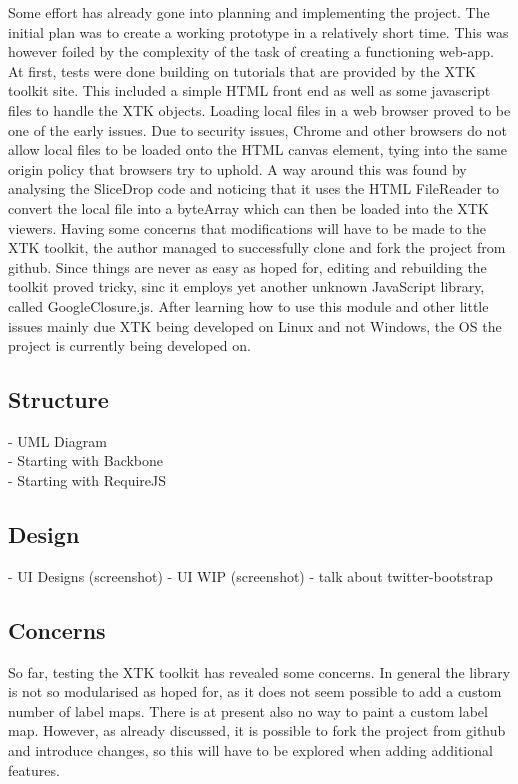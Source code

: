 \documentclass[a4paper,11pt,titlepage]{article}
\begin{document}
Some effort has already gone into planning and implementing the project. The initial plan was to create a working prototype in a relatively short time. This was however foiled by the complexity of the task of creating a functioning web-app. At first, tests were done building on tutorials that are provided by the XTK toolkit site. This included a simple HTML front end as well as some javascript files to handle the XTK objects.
Loading local files in a web browser proved to be one of the early issues. Due to security issues, Chrome and other browsers do not allow local files to be loaded onto the HTML canvas element, tying into the same origin policy that browsers try to uphold. A way around this was found by analysing the SliceDrop code and noticing that it uses the HTML FileReader to convert the local file into a byteArray which can then be loaded into the XTK viewers.
Having some concerns that modifications will have to be made to the XTK toolkit, the author managed to successfully clone and fork the project from github. Since things are never as easy as hoped for, editing and rebuilding the toolkit proved tricky, sinc it employs yet another unknown JavaScript library, called GoogleClosure.js. After learning how to use this module and other little issues mainly due XTK being developed on Linux and not Windows, the OS the project is currently being developed on.



\subsection{Structure}
- UML Diagram\\
- Starting with Backbone\\
- Starting with RequireJS

\subsection{Design}
- UI Designs (screenshot)
- UI WIP (screenshot)
- talk about twitter-bootstrap

\subsection{Concerns}

So far, testing the XTK toolkit has revealed some concerns. In general the library is not so modularised as hoped for, as it does not seem possible to add a custom number of label maps. There is at present also no way to paint a custom label map. However, as already discussed, it is possible to fork the project from github and introduce changes, so this will have to be explored when adding additional features.
\end{document}
